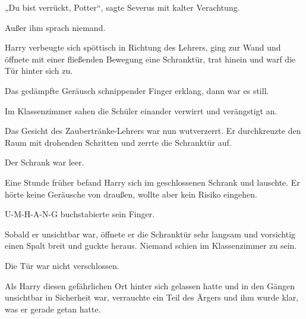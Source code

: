 „Du bist verrückt, Potter“, sagte Severus mit kalter Verachtung.

Außer ihm sprach niemand.

Harry verbeugte sich spöttisch in Richtung des Lehrers, ging zur Wand und öffnete mit einer fließenden Bewegung eine Schranktür, trat hinein und warf die Tür hinter sich zu.

Das gedämpfte Geräusch schnippender Finger erklang, dann war es still.

Im Klassenzimmer sahen die Schüler einander verwirrt und verängstigt an.

Das Gesicht des Zaubertränke-Lehrers war nun wutverzerrt. Er durchkreuzte den Raum mit drohenden Schritten und zerrte die Schranktür auf.

Der Schrank war leer.

\later

Eine Stunde früher befand Harry sich im geschlossenen Schrank und lauschte. Er hörte keine Geräusche von draußen, wollte aber kein Risiko eingehen.

U-M-H-A-N-G buchstabierte sein Finger.

Sobald er unsichtbar war, öffnete er die Schranktür sehr langsam und vorsichtig einen Spalt breit und guckte heraus. Niemand schien im Klassenzimmer zu sein.

Die Tür war nicht verschlossen.

Als Harry diesen gefährlichen Ort hinter sich gelassen hatte und in den Gängen unsichtbar in Sicherheit war, verrauchte ein Teil des Ärgers und ihm wurde klar, was er gerade getan hatte.

